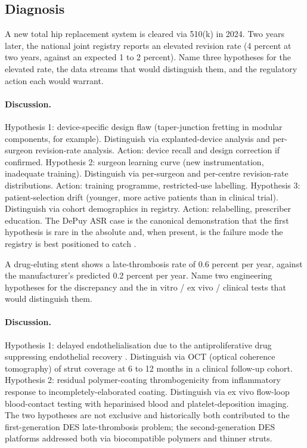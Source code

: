 \subsection*{Diagnosis}

\begin{exercise}
A new total hip replacement system is cleared via 510(k) in 2024.
Two years later, the national joint registry reports an elevated
revision rate (4 percent at two years, against an expected 1 to 2
percent). Name three hypotheses for the elevated rate, the data
streams that would distinguish them, and the regulatory action
each would warrant.
\end{exercise}

\paragraph{Discussion.}
Hypothesis 1: device-specific design flaw (taper-junction
fretting in modular components, for example). Distinguish via
explanted-device analysis and per-surgeon revision-rate analysis.
Action: device recall and design correction if confirmed.
Hypothesis 2: surgeon learning curve (new instrumentation,
inadequate training). Distinguish via per-surgeon and per-centre
revision-rate distributions. Action: training programme,
restricted-use labelling. Hypothesis 3: patient-selection drift
(younger, more active patients than in clinical trial).
Distinguish via cohort demographics in registry. Action:
relabelling, prescriber education. The DePuy ASR case is the
canonical demonstration that the first hypothesis is rare in the
absolute and, when present, is the failure mode the registry is
best positioned to catch
\cite{paper:v6c12-smith-asr-revision-2012, web:v6c12-aoanjrr-2023}.

\begin{exercise}
A drug-eluting stent shows a late-thrombosis rate of 0.6 percent
per year, against the manufacturer's predicted 0.2 percent per
year. Name two engineering hypotheses for the discrepancy and the
in vitro / ex vivo / clinical tests that would distinguish them.
\end{exercise}

\paragraph{Discussion.}
Hypothesis 1: delayed endothelialisation due to the
antiproliferative drug suppressing endothelial recovery
\cite{paper:v6c12-finn-des-pathology-2007}. Distinguish via OCT
(optical coherence tomography) of strut coverage at 6 to 12
months in a clinical follow-up cohort. Hypothesis 2: residual
polymer-coating thrombogenicity from inflammatory response to
incompletely-elaborated coating. Distinguish via ex vivo
flow-loop blood-contact testing with heparinised blood and
platelet-deposition imaging. The two hypotheses are not exclusive
and historically both contributed to the first-generation DES
late-thrombosis problem; the second-generation DES platforms
addressed both via biocompatible polymers and thinner struts.

